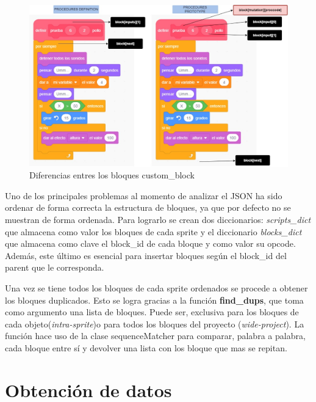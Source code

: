 \documentclass[a4paper, 12pt]{book}
\begin{document}
\begin{figure}[!htb]
  \centering
  \includegraphics[width=13cm, keepaspectratio]{img/scratch_custom.jpg}
  \caption{Diferencias entres los bloques custom\_block}
  \label{fig:scratch_special}
\end{figure}

\newpage 
Uno de los principales problemas al momento de analizar el JSON ha sido ordenar de forma correcta la estructura de bloques, ya que por defecto no se muestran de forma ordenada. Para lograrlo se crean dos diccionarios: \textit{scripts\_dict} que almacena como valor los bloques de cada sprite y el diccionario \textit{blocks\_dict} que almacena como clave el block\_id de cada bloque y como valor su opcode. Además, este último es esencial para insertar bloques según el block\_id del parent que le corresponda.

Una vez se tiene todos los bloques de cada sprite ordenados se procede a obtener los bloques duplicados. Esto se logra gracias a la función \textbf{find\_dups}, que toma como argumento una lista de bloques. Puede ser, exclusiva para los bloques de cada objeto(\textit{intra-sprite})o para todos los bloques del proyecto (\textit{wide-project}). La función hace uso de la clase sequenceMatcher para comparar, palabra a palabra, cada bloque entre sí y devolver una lista con los bloque que mas se repitan. 


\section{Obtención de datos} 
\label{sec:obtenciondatos}
\end{document}
